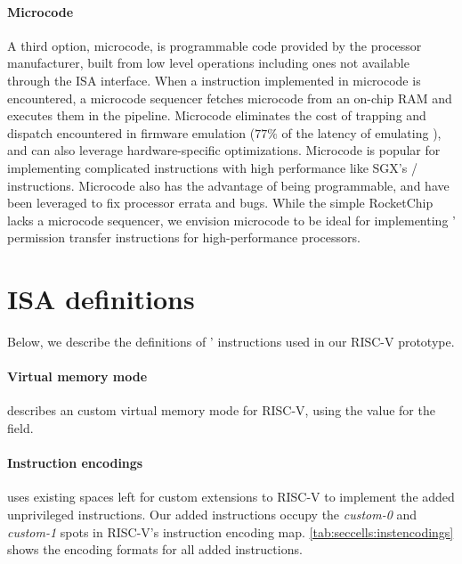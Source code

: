 \paragraph{Microcode}
A third option, microcode, is programmable code provided by the 
processor manufacturer, built from low level operations including ones 
not available through the ISA interface.
When a instruction implemented in microcode is encountered, a microcode
sequencer fetches microcode from an on-chip RAM and executes them in the
pipeline.
Microcode eliminates the cost of trapping and dispatch encountered in 
firmware emulation ($77\%$ of the latency of emulating \scprot),
and can also leverage hardware-specific optimizations.
Microcode is popular for implementing complicated instructions
with high performance like SGX's / instructions.
Microcode also has the advantage of being programmable, and have been
leveraged to fix processor errata and bugs.
While the simple RocketChip lacks a microcode sequencer, 
we envision microcode to be ideal for implementing \seccells'
permission transfer instructions for high-performance processors.


\section{\seccells ISA definitions}
\label{app:seccells:isa_def}
Below, we describe the definitions of \seccells' instructions used in our 
RISC-V prototype.

\paragraph{Virtual memory mode} 
\seccells describes an custom virtual memory mode for RISC-V, using the 
 value for the  field.

\paragraph{Instruction encodings}
\seccells uses existing spaces left for custom extensions to RISC-V to 
implement the added unprivileged instructions.
Our added instructions occupy the \emph{custom-0} and \emph{custom-1}
spots in RISC-V's instruction encoding map.
\autoref{tab:seccells:instencodings} shows the encoding formats for all
added instructions.

